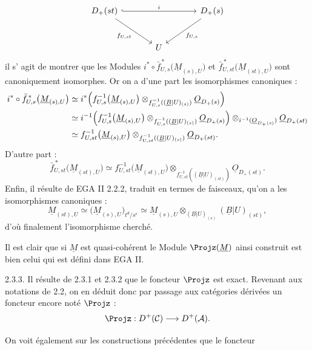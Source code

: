
\[
\begin{tikzcd}[column sep=large,row sep=large]
D_+(st) \arrow[rr,hook,"i"] \arrow[dr,"f_{U,st}"'] & &
D_+(s) \arrow[dl,"f_{U,s}"]\\
& U &
\end{tikzcd}
\]
il s'%
agit de montrer que les Modules \(i^*\circ\bar f_{U,s}^{\,*}\bigl(\underline{M}_{(s),U}\bigr)\) et \(\bar f_{U,st}^{\,*}\bigl(\underline{M}_{(st),U}\bigr)\)
sont canoniquement isomorphes. Or on a d'une part les isomorphismes canoniques :
\[
\begin{aligned}
i^*\circ\bar f_{U,s}^{\,*}\bigl(\underline{M}_{(s),U}\bigr)
&\simeq
i^*\Bigl(f_{U,s}^{-1}\bigl(\underline{M}_{(s),U}\bigr)
 \otimes_{f_{U,s}^{-1}((\underline{B}|U)_{(s)})}\underline{O}_{D_+(s)}\Bigr)\\
&\simeq
i^{-1}\Bigl(f_{U,s}^{-1}\bigl(\underline{M}_{(s),U}\bigr)
 \otimes_{f_{U,s}^{-1}((\underline{B}|U)_{(s)})}\underline{O}_{D_+(s)}\Bigr)
 \otimes_{i^{-1}(\underline{O}_{D_+(s)})}\underline{O}_{D_+(st)}\\
&\simeq
f_{U,st}^{-1}\bigl(\underline{M}_{(s),U}\bigr)
 \otimes_{f_{U,st}^{-1}((\underline{B}|U)_{(s)})}\underline{O}_{D_+(st)} .
\end{aligned}
\]
D'autre part :
\[
  \bar f_{U,st}^{\,*}\bigl(\underline{M}_{(st),U}\bigr)
  \simeq
  f_{U,st}^{-1}\bigl(\underline{M}_{(st),U}\bigr)
  \otimes_{f_{U,st}^{-1}((\underline{B}|U)_{(st)})}\underline{O}_{D_+(st)} .
\]
Enfin, il résulte de EGA II 2.2.2, traduit en termes de faisceaux, qu'on a les isomorphismes canoniques :
\[
  \underline{M}_{(st),U}\simeq
  \bigl(\underline{M}_{(s),U}\bigr)_{t^d/s^e}
  \simeq
  \underline{M}_{(s),U}\otimes_{(\underline{B}|U)_{(s)}}(\underline{B}|U)_{(st)},
\]
d'où finalement l'isomorphisme cherché.

Il est clair que si \(\underline{M}\) est quasi-cohérent le Module \(\Projz(\underline{M})\) ainsi construit est bien celui qui est défini dans EGA II.

2.3.3. Il résulte de 2.3.1 et 2.3.2 que le foncteur \(\Projz\) est exact. Revenant aux notations de 2.2, on en déduit donc par passage aux catégories dérivées un foncteur encore noté \(\Projz\) :
\[
  \Projz:D^+(\mathcal C)\longrightarrow D^+(\mathcal A).
\]

On voit également sur les constructions précédentes que le foncteur
